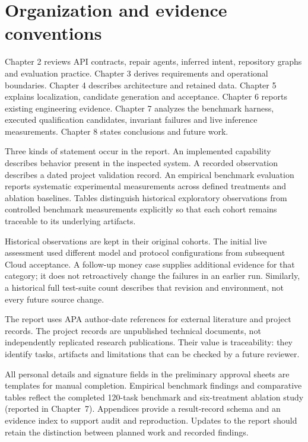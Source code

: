 \documentclass[12pt,a4paper,oneside]{report}
\begin{document}
\section{Organization and evidence conventions}

Chapter 2 reviews API contracts, repair agents, inferred intent, repository graphs and evaluation practice. Chapter 3 derives requirements and operational boundaries. Chapter 4 describes architecture and retained data. Chapter 5 explains localization, candidate generation and acceptance. Chapter 6 reports existing engineering evidence. Chapter 7 analyzes the benchmark harness, executed qualification candidates, invariant failures and live inference measurements. Chapter 8 states conclusions and future work.

Three kinds of statement occur in the report. An implemented capability describes behavior present in the inspected system. A recorded observation describes a dated project validation record. An empirical benchmark evaluation reports systematic experimental measurements across defined treatments and ablation baselines. Tables distinguish historical exploratory observations from controlled benchmark measurements explicitly so that each cohort remains traceable to its underlying artifacts.

Historical observations are kept in their original cohorts. The initial live assessment used different model and protocol configurations from subsequent Cloud acceptance. A follow-up money case supplies additional evidence for that category; it does not retroactively change the failures in an earlier run. Similarly, a historical full test-suite count describes that revision and environment, not every future source change.

The report uses APA author-date references for external literature and project records. The project records are unpublished technical documents, not independently replicated research publications. Their value is traceability: they identify tasks, artifacts and limitations that can be checked by a future reviewer.

All personal details and signature fields in the preliminary approval sheets are templates for manual completion. Empirical benchmark findings and comparative tables reflect the completed 120-task benchmark and six-treatment ablation study (reported in Chapter~7). Appendices provide a result-record schema and an evidence index to support audit and reproduction. Updates to the report should retain the distinction between planned work and recorded findings.
\end{document}
